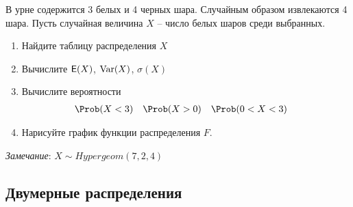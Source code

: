 \begin{exercise}
В урне содержится 3 белых и 4 черных шара. Случайным образом извлекаются
4 шара. Пусть случайная величина \(X\) -- число белых шаров среди выбранных.
\begin{enumerate}
	\item Найдите таблицу распределения \(X\)
	\item Вычислите \({\mathsf E}(X)\), \(\operatorname{Var}(X)\), \(\sigma(X)\)
	\item Вычислите вероятности
	\begin{align*}
		&\Prob(X<3) & &\Prob(X>0) & &\Prob(0<X<3)
	\end{align*}
	\item Нарисуйте график функции распределения \(F\).
\end{enumerate}
\textit{Замечание}: \(X\sim Hypergeom(7,2,4)\)
\end{exercise}

\subsection{Двумерные распределения}

